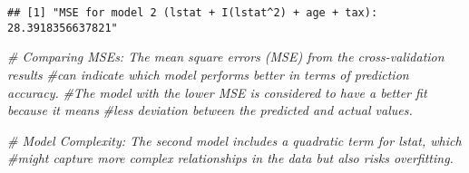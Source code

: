 \documentclass[
  12pt,
]{article}
\newenvironment{Shaded}{\begin{snugshade}}{\end{snugshade}}
\newcommand{\CommentTok}[1]{\textcolor[rgb]{0.56,0.35,0.01}{\textit{#1}}}
\begin{document}
\begin{verbatim}
## [1] "MSE for model 2 (lstat + I(lstat^2) + age + tax): 28.3918356637821"
\end{verbatim}

\begin{Shaded}
\begin{Highlighting}[]
\CommentTok{\# Comparing MSEs: The mean square errors (MSE) from the cross{-}validation results}
\CommentTok{\#can indicate which model performs better in terms of prediction accuracy.}
\CommentTok{\#The model with the lower MSE is considered to have a better fit because it means}
\CommentTok{\#less deviation between the predicted and actual values.}

\CommentTok{\# Model Complexity: The second model includes a quadratic term for lstat, which }
\CommentTok{\#might capture more complex relationships in the data but also risks overfitting.}
\end{Highlighting}
\end{Shaded}
\end{document}
